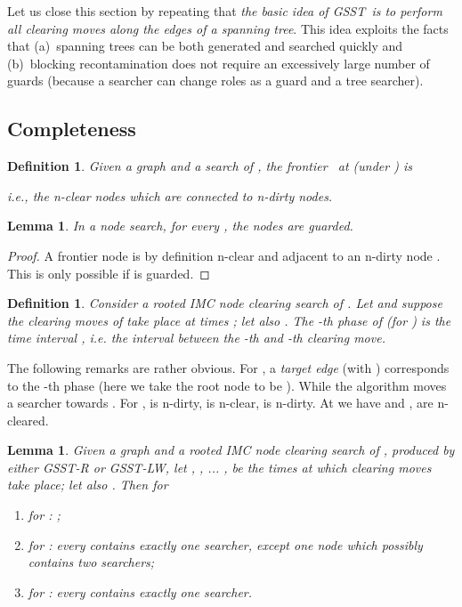 \documentclass[11pt]{article}\usepackage{amsmath}
\newtheorem{definition}[theorem]{Definition}
\newtheorem{lemma}[theorem]{Lemma}
{\theoremstyle{definition}
\newtheorem{notation}[theorem]{Notation}
}
\begin{document}
Let us close this section by repeating that \emph{the basic idea of GSST\ is
to perform all clearing moves along the edges of a spanning tree}. This idea
exploits the facts that (a)\ spanning trees can be both generated and searched
quickly and (b)\ blocking recontamination does not require an excessively
large number of guards (because a searcher can change roles as a guard and a
tree searcher).

\subsection{Completeness}

\label{sec0503}

\begin{definition}
\label{prp0504}Given a graph  and a search  of
, the \emph{frontier }\ at  (under ) is

i.e., the n-clear nodes which are connected to n-dirty nodes.
\end{definition}

\begin{lemma}
\label{prp0505}In a node search, for every , the nodes  are guarded.
\end{lemma}

\begin{proof}
A frontier node  is by definition n-clear and adjacent to an n-dirty node
. This is only possible if  is guarded.
\end{proof}

\begin{definition}
\label{prp0506}Consider a rooted IMC node clearing search  of
. Let  and suppose the clearing moves of 
take place at times ; let also . The -th
\emph{phase} of  (for ) is the time interval , i.e. the interval between the -th and -th clearing move.
\end{definition}

The following remarks are rather obvious. For , a \emph{target edge
} (with ) corresponds to the -th
phase (here we take the root node to be ). While  the algorithm moves a searcher towards .
For ,  is n-dirty, 
is n-clear,  is n-dirty. At  we have  and ,  are n-cleared.

\begin{lemma}
\label{prp0507}Given a graph  and a rooted
IMC node clearing search  of , produced by either
GSST-R or GSST-LW, let , , ... ,  be the times at
which clearing moves take place; let also . Then for 

\begin{enumerate}
\item for : ;

\item for : every  contains exactly one searcher, except one node  which possibly contains two searchers;

\item for : every  contains
exactly one searcher.
\end{enumerate}
\end{lemma}
\end{document}

